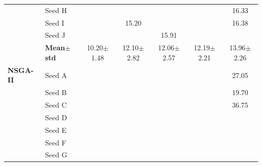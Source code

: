 \begin{table}[H]
{\begin{tabular}{@{}llccccc@{}}
  & Seed H & \cellcolor{RoyalBlue!10}{\small 9.03} & \cellcolor{RoyalBlue!10}{\small 14.38} & \cellcolor{RoyalBlue!10}{\small 10.75} & \cellcolor{RoyalBlue!10}{\small 13.58} & {\small\color{gray!60!black}16.33} \\
  & Seed I & \cellcolor{RoyalBlue!10}{\small 11.96} & {\small\color{gray!60!black}15.20} & \cellcolor{RoyalBlue!10}{\small 10.93} & \cellcolor{RoyalBlue!10}{\small 12.99} & {\small\color{gray!60!black}16.38} \\
  & Seed J & \cellcolor{RoyalBlue!10}{\small 9.45} & \cellcolor{RoyalBlue!10}{\small 12.59} & {\small\color{gray!60!black}15.91} & \cellcolor{RoyalBlue!10}{\small 14.71} & \cellcolor{RoyalBlue!10}{\small 14.79} \\
 & \textbf{Mean$\pm$std} & \cellcolor{RoyalBlue!20}10.20$\pm$1.48 & \cellcolor{RoyalBlue!20}12.10$\pm$2.82 & \cellcolor{RoyalBlue!20}12.06$\pm$2.57 & \cellcolor{RoyalBlue!20}12.19$\pm$2.21 & \cellcolor{RoyalBlue!20}13.96$\pm$2.26 \\
\midrule
 \textbf{NSGA-II} & Seed A & \cellcolor{RoyalBlue!10}{\small 3.43} & \cellcolor{RoyalBlue!10}{\small 5.97} & \cellcolor{RoyalBlue!10}{\small 13.12} & \cellcolor{RoyalBlue!10}{\small 9.28} & {\small\color{gray!60!black}27.05} \\
  & Seed B & \cellcolor{RoyalBlue!10}{\small 7.01} & \cellcolor{RoyalBlue!10}{\small 10.51} & \cellcolor{RoyalBlue!10}{\small 10.99} & \cellcolor{RoyalBlue!10}{\small 13.41} & {\small\color{gray!60!black}19.70} \\
  & Seed C & \cellcolor{RoyalBlue!10}{\small 6.74} & \cellcolor{RoyalBlue!10}{\small 13.86} & \cellcolor{RoyalBlue!10}{\small 11.44} & \cellcolor{RoyalBlue!10}{\small 14.82} & {\small\color{gray!60!black}36.75} \\
  & Seed D & \cellcolor{RoyalBlue!10}{\small 3.67} & \cellcolor{RoyalBlue!10}{\small 6.87} & \cellcolor{RoyalBlue!10}{\small 7.20} & \cellcolor{RoyalBlue!10}{\small 8.87} & \cellcolor{RoyalBlue!10}{\small 10.66} \\
  & Seed E & \cellcolor{RoyalBlue!10}{\small 3.92} & \cellcolor{RoyalBlue!10}{\small 7.80} & \cellcolor{RoyalBlue!10}{\small 6.40} & \cellcolor{RoyalBlue!10}{\small 8.71} & \cellcolor{RoyalBlue!10}{\small 10.09} \\
  & Seed F & \cellcolor{RoyalBlue!10}{\small 4.04} & \cellcolor{RoyalBlue!10}{\small 5.61} & \cellcolor{RoyalBlue!10}{\small 9.72} & \cellcolor{RoyalBlue!10}{\small 9.13} & \cellcolor{RoyalBlue!10}{\small 10.40} \\
  & Seed G & \cellcolor{RoyalBlue!10}{\small 4.02} & \cellcolor{RoyalBlue!10}{\small 9.38} & \cellcolor{RoyalBlue!10}{\small 6.33} & \cellcolor{RoyalBlue!10}{\small 9.09} & \cellcolor{RoyalBlue!10}{\small 10.39} \\

\end{tabular}}
\end{table}
